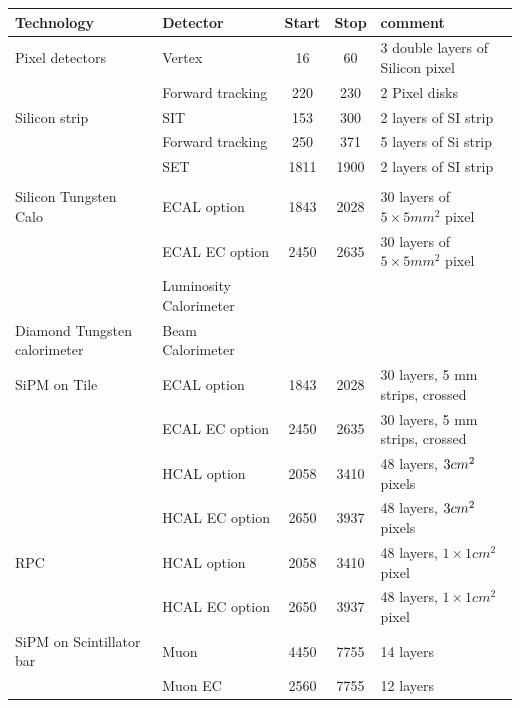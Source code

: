 \documentclass[%
 amsmath,amssymb,
 aps,
]{revtex4-1}
\renewcommand{\toprule}{\hline}
\newcommand{\midrule}{\hline}
\begin{document}
\begin{table}[]
    \centering
    \begin{tabular}{|l|l|c|c|p{4cm}|}
    \toprule
        Technology & Detector & Start   & Stop & comment \\
        \midrule
Pixel detectors & Vertex & 16   & 60   & 3 double layers of Silicon pixel \\
& Forward tracking  & 220 & 230 & 2 Pixel disks \\
\midrule
Silicon strip   & SIT    & 153  & 300  & 2 layers of SI strip            \\
& Forward tracking  & 250 & 371 & 5 layers of Si strip\\
                & SET    & 1811 & 1900 & 2 layers of SI strip           \\
                & & & & \\
\midrule
Silicon Tungsten Calo & ECAL option& 1843 & 2028 & 30 layers of $5\times5 mm^2$ pixel \\
& ECAL EC option & 2450 & 2635 & 30 layers of $5\times5 mm^2$ pixel \\
& Luminosity Calorimeter & & & \\
\midrule
Diamond Tungsten calorimeter & Beam Calorimeter & &&\\
\midrule
SiPM on Tile & ECAL option   & 1843 & 2028 & 30 layers, 5 mm strips, crossed\\
& ECAL EC option& 2450 & 2635 & 30 layers, 5 mm strips, crossed\\
             & HCAL option   & 2058 & 3410 & 48 layers, $3\time3 cm^2$ pixels\\
             & HCAL EC option& 2650 & 3937 & 48 layers, $3\time3 cm^2$ pixels\\
\midrule
RPC          & HCAL option   & 2058 & 3410 & 48 layers, $1 \times 1 cm^2$ pixel \\
& HCAL EC option & 2650 & 3937 & 48 layers, $1 \times 1 cm^2$ pixel\\
\midrule
SiPM on Scintillator bar & Muon & 4450 & 7755 & 14 layers \\
& Muon EC & 2560 & 7755 & 12 layers \\


\end{tabular}
\end{table}
\end{document}
